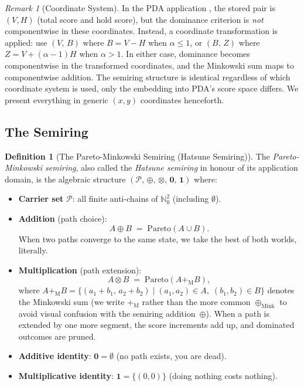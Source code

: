\documentclass[11pt, letterpaper]{article}
\theoremstyle{definition}
\newtheorem{definition}[theorem]{Definition}
\theoremstyle{remark}
\newtheorem{remark}[theorem]{Remark}
\begin{document}
\begin{remark}[Coordinate System]
\label{rem:coords}
In the PDA application \cite{Chang2026}, the stored pair is $(V, H)$ (total score and hold score), but the dominance criterion is \emph{not} componentwise in these coordinates.
Instead, a coordinate transformation is applied: use $(V,\, B)$ where $B = V - H$ when $\alpha \le 1$, or $(B,\, Z)$ where $Z = V + (\alpha{-}1)H$ when $\alpha > 1$.
In either case, dominance becomes componentwise in the transformed coordinates, and the Minkowski sum maps to componentwise addition.
The semiring structure is identical regardless of which coordinate system is used, only the embedding into PDA's score space differs.
We present everything in generic $(x, y)$ coordinates henceforth.
\end{remark}

\subsection{The Semiring}

\begin{definition}[The Pareto-Minkowski Semiring (Hatsune Semiring)]
\label{def:semiring}
The \emph{Pareto-Minkowski semiring}, also called the \emph{Hatsune semiring} in honour of its application domain, is the algebraic structure $(\mathcal{P},\, \oplus,\, \otimes,\, \mathbf{0},\, \mathbf{1})$ where:
\begin{itemize}[leftmargin=*]
    \item \textbf{Carrier set} $\mathcal{P}$: all finite anti-chains of $\mathbb{N}_0^2$ (including $\emptyset$).
    \item \textbf{Addition} (path choice):
    \[
        A \oplus B \;=\; \mathrm{Pareto}(A \cup B).
    \]
    When two paths converge to the same state, we take the best of both worlds, literally.
    \item \textbf{Multiplication} (path extension):
    \[
        A \otimes B \;=\; \mathrm{Pareto}(A +_{\mathrm{M}} B),
    \]
    where $A +_{\mathrm{M}} B = \{(a_1{+}b_1,\, a_2{+}b_2) \mid (a_1, a_2) \in A,\; (b_1, b_2) \in B\}$ denotes the Minkowski sum (we write $+_{\mathrm{M}}$ rather than the more common $\oplus_{\mathrm{Mink}}$ to avoid visual confusion with the semiring addition~$\oplus$).
    When a path is extended by one more segment, the score increments add up, and dominated outcomes are pruned.
    \item \textbf{Additive identity}: $\mathbf{0} = \emptyset$ (no path exists, you are dead).
    \item \textbf{Multiplicative identity}: $\mathbf{1} = \{(0, 0)\}$ (doing nothing costs nothing).
\end{itemize}
\end{definition}
\end{document}
